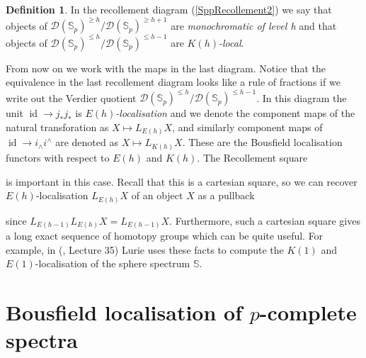 \documentclass[a4paper]{article} %
\theoremstyle{definition}
\newtheorem{definition}[theorem]{Definition}
\newcommand{\Sph}{\mathbb{S}}
\newcommand{\Spp}{\mathcal{D}(\mathbb{S}_p)}
\begin{document}
\begin{definition}
In the recollement diagram (\ref{SppRecollement2}) we say that objects of $\Spp^{\ge h}/\Spp^{\ge h+1}$ are \textit{monochromatic of level h} and that objects of $\Spp^{\le h}/\Spp^{\le h-1}$ are $K(h)$\textit{-local}.
\end{definition}
From now on we work with the maps in the last diagram. Notice that the equivalence in the last recollement diagram looks like a rule of fractions if we write out the Verdier quotient $\Spp^{\le h} / \Spp^{\le h -1}$. In this diagram the unit $\operatorname{id} \to j_*j_*$ is $E(h)$\textit{-localisation} and we denote the component maps of the natural transforation as $X \mapsto L_{E(h)}X$, and similarly component maps of $\operatorname{id} \to i_\wedge i^\wedge$ are denoted as $X \mapsto L_{K(h)}X$. These are the Bousfield localisation functors with respect to $E(h)$ and $K(h)$. The Recollement square
\begin{center}
\end{center}
is important in this case. Recall that this is a cartesian square, so we can recover $E(h)$-localisation $L_{E(h)}X$ of an object $X$ as a pullback
\begin{center}
\end{center}
since $L_{E(h-1)}L_{E(h)}X = L_{E(h-1)}X$. Furthermore, such a cartesian square gives a long exact sequence of homotopy groups which can be quite useful. For example, in (\cite{luriechromatichomotopytheorynotes}, Lecture 35) Lurie uses these facts to compute the $K(1)$ and $E(1)$-localisation of the sphere spectrum $\Sph$.

\section{Bousfield localisation of $p$-complete spectra}\label{Section:bousfieldlocal}
\end{document}
